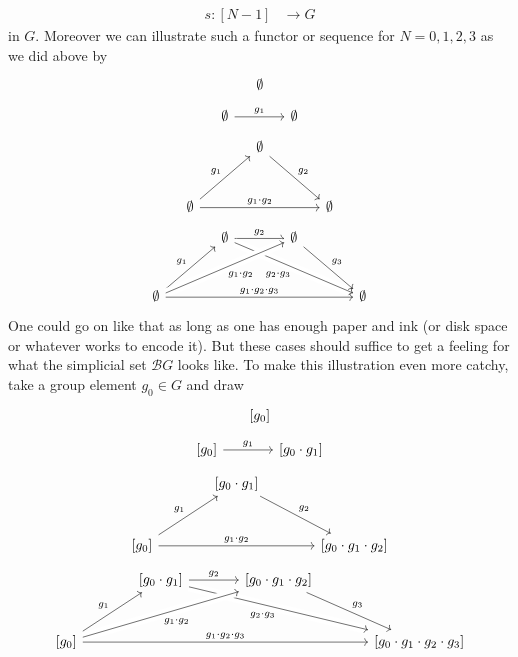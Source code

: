 \begin{align*}
  s
  \colon
  [N - 1]
  &\rightarrow
  G
\end{align*}
in $G$.
Moreover we can illustrate such a functor or sequence for $N = 0,1,2,3$ as we did above by
\[
\begin{tikzcd}[sep=large]
  \emptyset
\end{tikzcd}
\]
\[
\begin{tikzcd}[sep=large]
  \emptyset
  \arrow{r}{g_{1}}
  &
  \emptyset
\end{tikzcd}
\]
\[
\begin{tikzcd}[sep=large]
  &
  \emptyset
  \arrow{rd}{g_{2}}
  &
  \\
  \emptyset
  \arrow{ru}{g_{1}}
  \arrow{rr}{g_{1} \cdot g_{2}}
  &
  &
  \emptyset
\end{tikzcd}
\]
\[
\begin{tikzcd}[sep=large]
  &
  \emptyset
  \arrow{r}{g_{2}}
  \arrow[swap,crossing over]{rrd}{g_{2} \cdot g_{3}}
  &
  \emptyset
  \arrow{rd}{g_{3}}
  &
  \\
  \emptyset
  \arrow{ru}{g_{1}}
  \arrow[swap,crossing over]{rru}{g_{1} \cdot g_{2}}
  \arrow{rrr}{g_{1} \cdot g_{2} \cdot g_{3}}
  &
  &
  &
  \emptyset
\end{tikzcd}
\]
One could go on like that as long as one has enough paper and ink (or disk space or whatever works to encode it).
But these cases should suffice to get a feeling for what the simplicial set $\mathcal{B}G$ looks like.
To make this illustration even more catchy, take a group element $g_{0} \in G$ and draw
\[
\begin{tikzcd}[sep=large]
  \left[
    g_{0}
  \right]
\end{tikzcd}
\]
\[
\begin{tikzcd}[sep=large]
  \left[
    g_{0}
  \right]
  \arrow{r}{g_{1}}
  &
  \left[
    g_{0}
    \cdot
    g_{1}
  \right]
\end{tikzcd}
\]
\[
\begin{tikzcd}[sep=large]
  &
  \left[
    g_{0}
    \cdot
    g_{1}
  \right]
  \arrow{rd}{g_{2}}
  &
  \\
  \left[
    g_{0}
  \right]
  \arrow{ru}{g_{1}}
  \arrow{rr}{g_{1} \cdot g_{2}}
  &
  &
  \left[
    g_{0}
    \cdot
    g_{1}
    \cdot
    g_{2}
  \right]
\end{tikzcd}
\]
\[
\begin{tikzcd}[sep=large]
  &
  \left[
    g_{0}
    \cdot
    g_{1}
  \right]
  \arrow{r}{g_{2}}
  \arrow[swap,crossing over]{rrd}{g_{2} \cdot g_{3}}
  &
  \left[
    g_{0}
    \cdot
    g_{1}
    \cdot
    g_{2}
  \right]
  \arrow{rd}{g_{3}}
  &
  \\
  \left[
    g_{0}
    \right]
  \arrow{ru}{g_{1}}
  \arrow[swap,crossing over]{rru}{g_{1} \cdot g_{2}}
  \arrow{rrr}{g_{1} \cdot g_{2} \cdot g_{3}}
  &
  &
  &
  \left[
    g_{0}
    \cdot
    g_{1}
    \cdot
    g_{2}
    \cdot
    g_{3}
  \right]
\end{tikzcd}
\]
